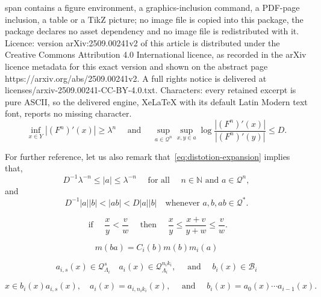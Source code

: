 \documentclass[10pt,a4paper]{amsart}
\newcommand{\N}{{\mathbb N}}
\newcommand{\cB}{{\mathcal B}}
\newcommand{\cQ}{{\mathcal Q}}
\newcommand{\quand}{\quad\text{ and } \quad}
\begin{document}
span contains a figure environment, a graphics-inclusion command, a PDF-page inclusion, a table or a TikZ picture; no image file is copied into this package, the package declares no asset dependency and no image file is redistributed with it. Licence: version arXiv:2509.00241v2 of this article is distributed under the Creative Commons Attribution 4.0 International licence, as recorded in the arXiv licence metadata for this exact version and shown on the abstract page https://arxiv.org/abs/2509.00241v2. A full rights notice is delivered at licenses/arxiv-2509.00241-CC-BY-4.0.txt. Characters: every retained excerpt is pure ASCII, so the delivered engine, XeLaTeX with its default Latin Modern text font, reports no missing character.
\begin{equation}\label{eq:distotion-expansion}
  	\inf_{x\in Y} \left|(F^n)'(x)\right| \ge \lambda^n
	\quad\text{ and }\quad
	\sup_{a\in\cQ^n}\sup_{ x,y\in a } \log \frac{| (F^n)' (x)|}{| (F^n)' (y) |} \le D.
\end{equation}

\begin{remark}\label{rem:dist-exp}
  For further reference, let us also remark that~\eqref{eq:distotion-expansion} implies that,
  \begin{equation}\label{smallLeb}
    D^{-1}\lambda^{-n}
    \le|a|\le \lambda^{-n}
    \quad\text{ for all }\quad n\in \N \text{ and }a\in\cQ^n,
  \end{equation}
  and
  \[
  	D^{-1} |a||b| < |ab| < D |a||b|
    \quad
    \text{whenever $a,b,ab \in \cQ^*$.}
  \]
\end{remark}

\begin{equation}\label{eq:abcd-clever}
 \text{ if }\quad \frac x y < \frac v w
    \quad\text{ then }\quad
    \frac{x}{y} \le \frac{ x + v }{ y + w } \le \frac{v}{w}.
\end{equation}

\begin{equation}\label{eq:def-m-new}
  m(ba) = C_i(b) m(b) m_i (a)
\end{equation}

\begin{equation}\label{eq:def-ai-bi-ais-1}
  a_{i,s} (x)\in \cQ_{\Lambda_i}^s
  \quad
  a_{i} (x) \in \cQ_{\Lambda_i}^{n_{i}k_{i}},
  \quand b_i(x) \in\cB_i
\end{equation}

\begin{equation}\label{eq:def-ai-bi-ais-2}
  x \in b_{i}(x)a_{i,s} (x), \quad
  a_{i}(x) = a_{i,n_{i}k_i} (x),\quand
  b_i (x) = a_{0} (x) \cdots a_{i - 1} (x).
\end{equation}
\end{document}
